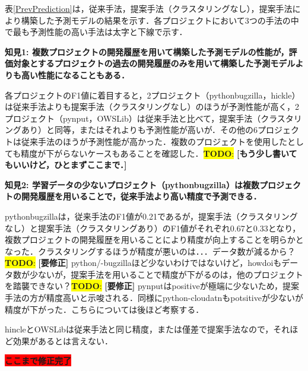 \documentclass[T,J]{fose} %
\newcommand{\todo}[1]{\colorbox{yellow}{{\bf TODO}:}{\color{red} {\textbf{[#1]}}}}
\begin{document}
表\ref{PrevPrediction}は，従来手法，提案手法（クラスタリングなし），提案手法により構築した予測モデルの結果を示す．各プロジェクトにおいて3つの手法の中で最も予測性能の高い手法は太字と下線で示す．

\noindent\textbf{知見1: 複数プロジェクトの開発履歴を用いて構築した予測モデルの性能が，評価対象とするプロジェクトの過去の開発履歴のみを用いて構築した予測モデルよりも高い性能になることもある．}

各プロジェクトのF1値に着目すると，2プロジェクト（python\-bugzilla，hickle）は従来手法よりも提案手法（クラスタリングなし）のほうが予測性能が高く，2プロジェクト（pynput，OWSLib）は従来手法と比べて，提案手法（クラスタリングあり）と同等，またはそれよりも予測性能が高いが．その他の6プロジェクトは従来手法のほうが予測性能が高かった．複数のプロジェクトを使用したとしても精度が下がらないケースもあることを確認した．\todo{もう少し書いてもいいけど，ひとまずここまで．}

\noindent\textbf{知見2: 学習データの少ないプロジェクト（python\-bugzilla）は複数プロジェクトの開発履歴を用いることで，従来手法より高い精度で予測できる．}

python\-bugzillaは，従来手法のF1値が0.21であるが，提案手法（クラスタリングなし）と提案手法（クラスタリングあり）のF1値がそれぞれ0.67と0.33となり，複数プロジェクトの開発履歴を用いることにより精度が向上することを明らかとなった．クラスタリングするほうが精度が悪いのは．．．データ数が減るから？\todo{要修正}
python/-bugzillaほど少ないわけではないけど，howdoiもデータ数が少ないが，提案手法を用いることで精度が下がるのは，他のプロジェクトを踏襲できない？\todo{要修正}
pynputはpositiveが極端に少ないため，提案手法の方が精度高いと示唆される．同様にpython-cloudatnもpotsitiveが少ないが精度が下がった．こちらについては後ほど考察する．

hincleとOWSLibは従来手法と同じ精度，または僅差で提案手法なので，それほど効果があるとは言えない．

\colorbox{red}{{\bf ここまで修正完了}}


%
%
\end{document}
